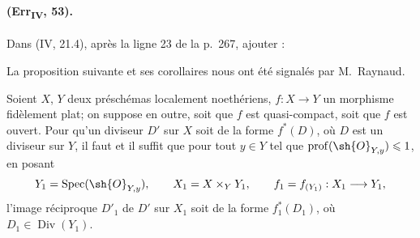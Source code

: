 \paragraph{(Err\textsubscript{IV}, 53).}
Dans (IV, 21.4), après la ligne 23 de la p.~267, ajouter :

La proposition suivante et ses corollaires nous ont été signalés par
M.~Raynaud.

\begin{proposition}[21.4.9]
Soient $X$, $Y$ deux préschémas localement noethériens,
$f:X\to Y$ un morphisme fidèlement plat; on suppose en outre, soit que
$f$ est quasi-compact, soit que $f$ est ouvert. Pour qu'un diviseur
$D'$ sur $X$ soit de la forme $f^*(D)$, où $D$ est un diviseur sur
$Y$, il faut et il suffit que pour tout $y\in Y$ tel que
$\operatorname{prof}(\sh{O}_{Y,y})\leq1$, en posant
\[
 Y_1=\operatorname{Spec}(\sh{O}_{Y,y}),\qquad
 X_1=X\times_YY_1,\qquad
 f_1=f_{(Y_1)}:X_1\to Y_1,
\]
l'image réciproque $D'_1$ de $D'$ sur $X_1$ soit de la forme
$f_1^*(D_1)$, où $D_1\in\operatorname{Div}(Y_1)$.
\end{proposition}

